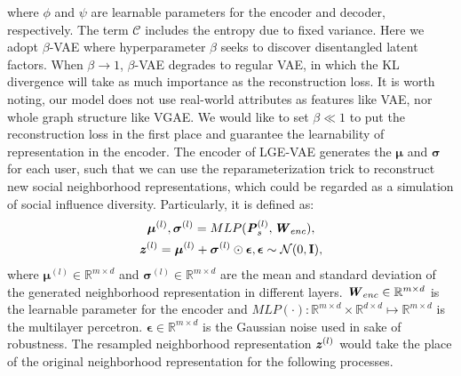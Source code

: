 \documentclass[letterpaper]{article} %
\begin{document}
where $\phi$ and $\psi$ are learnable parameters for the encoder and decoder, respectively. The term $\mathcal{C}$ includes the entropy due to fixed variance. Here we adopt $\beta$-VAE where hyperparameter $\beta$ seeks to discover disentangled latent factors. When $\beta \rightarrow 1$, $\beta$-VAE degrades to regular VAE, in which the KL divergence will take as much importance as the reconstruction loss. It is worth noting, our model does not use real-world attributes as features like VAE, nor whole graph structure like VGAE. We would like to set $\beta \ll 1$ to put the reconstruction loss in the first place and guarantee the learnability of representation in the encoder. The encoder of LGE-VAE generates the $\boldsymbol{\mu}$ and $\boldsymbol{\sigma}$ for each user, such that we can use the reparameterization trick to reconstruct new social neighborhood representations, which could be regarded as a simulation of social influence diversity. Particularly, it is defined as:
\begin{gather}
    \boldsymbol{\mu}^{(l)}, \boldsymbol{\sigma}^{(l)} = MLP(\textbf{\textit{P}}_{s}^{(l)}, \textbf{\textit{W}}_{enc}),\\
    \textbf{\textit{z}}^{(l)} = \boldsymbol{\mu}^{(l)}+\boldsymbol{\sigma}^{(l)}\odot\boldsymbol{\epsilon}, \boldsymbol{\epsilon} \sim \mathcal{N}(0,\textbf{I}),
\end{gather}
where $\boldsymbol{\mu}^{(l)} \in \mathbb{R}^{m\times d}$ and $\boldsymbol{\sigma}^{(l)} \in \mathbb{R}^{m\times d}$ are the mean and standard deviation of the generated neighborhood representation in different layers. $\textbf{\textit{W}}_{enc} \in \mathbb{R}^{m\times d}$ is the learnable parameter for the encoder and $MLP(\cdot): \mathbb{R}^{m\times d}\times \mathbb{R}^{d\times d} \mapsto \mathbb{R}^{m\times d}$ is the multilayer percetron. $\boldsymbol{\epsilon} \in \mathbb{R}^{m\times d}$ is the Gaussian noise used in sake of robustness. The resampled neighborhood representation $\textbf{\textit{z}}^{(l)}$ would take the place of the original neighborhood representation for the following processes.
\end{document}

